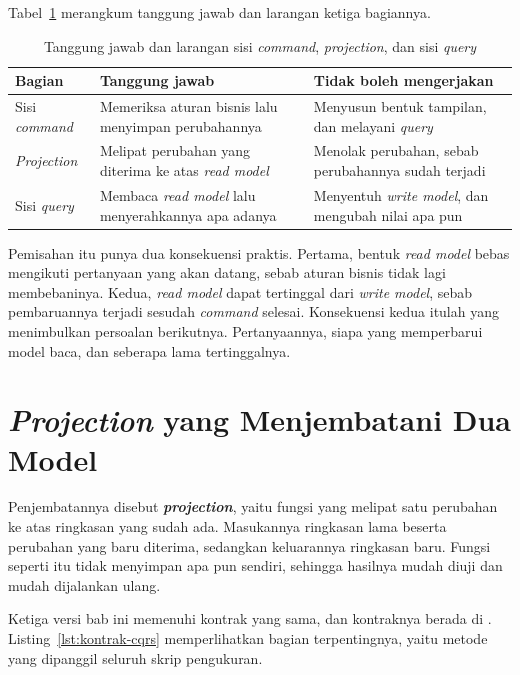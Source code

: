 Tabel~\ref{tab:sisi-perintah-kueri} merangkum tanggung jawab dan larangan
ketiga bagiannya.

\begin{table}[htbp]
  \centering
  \caption{Tanggung jawab dan larangan sisi \textit{command}, \textit{projection}, dan sisi \textit{query}}
  \label{tab:sisi-perintah-kueri}
  \begin{tabularx}{\textwidth}{|l|X|X|}
    \hline
    \textbf{Bagian} & \textbf{Tanggung jawab} & \textbf{Tidak boleh mengerjakan} \\
    \hline
    Sisi \textit{command} & Memeriksa aturan bisnis lalu menyimpan perubahannya & Menyusun bentuk tampilan, dan melayani \textit{query} \\
    \hline
    \textit{Projection} & Melipat perubahan yang diterima ke atas \textit{read model} & Menolak perubahan, sebab perubahannya sudah terjadi \\
    \hline
    Sisi \textit{query} & Membaca \textit{read model} lalu menyerahkannya apa adanya & Menyentuh \textit{write model}, dan mengubah nilai apa pun \\
    \hline
  \end{tabularx}
\end{table}

Pemisahan itu punya dua konsekuensi praktis. Pertama, bentuk \textit{read model} bebas
mengikuti pertanyaan yang akan datang, sebab aturan bisnis tidak lagi
membebaninya. Kedua, \textit{read model} dapat tertinggal dari \textit{write model}, sebab
pembaruannya terjadi sesudah \textit{command} selesai. Konsekuensi kedua itulah yang
menimbulkan persoalan berikutnya. Pertanyaannya, siapa yang memperbarui model
baca, dan seberapa lama tertinggalnya.

\section{\textit{Projection} yang Menjembatani Dua Model}

Penjembatannya disebut \textbf{\textit{projection}}, yaitu fungsi yang melipat satu
perubahan ke atas ringkasan yang sudah ada. Masukannya ringkasan lama beserta
perubahan yang baru diterima, sedangkan keluarannya ringkasan baru. Fungsi
seperti itu tidak menyimpan apa pun sendiri, sehingga hasilnya mudah diuji dan
mudah dijalankan ulang.

Ketiga versi bab ini memenuhi kontrak yang sama, dan kontraknya berada di
. Listing~\ref{lst:kontrak-cqrs}
memperlihatkan bagian terpentingnya, yaitu metode yang dipanggil seluruh skrip
pengukuran.

